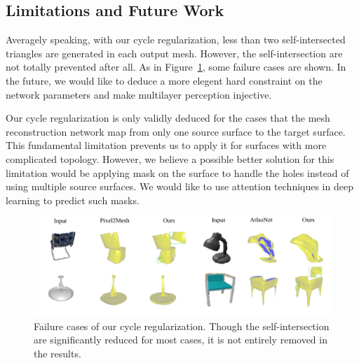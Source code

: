 \subsection{Limitations and Future Work}
Averagely speaking, with our cycle regularization, less than two self-intersected triangles are generated in each output mesh. However, the self-intersection are not totally prevented after all. As in Figure~\ref{fig:limit}, some failure cases are shown. In the future,  we would like to deduce a more elegent hard constraint on the network parameters and make multilayer perception injective. 

Our cycle regularization is only validly deduced for the cases that the mesh reconstruction network map from only one source surface to the target surface. This fundamental limitation prevents us to apply it for surfaces with more complicated topology. However, we believe a possible better solution for this limitation would be applying mask on the surface to handle the holes instead of using multiple source surfaces. We would like to use attention techniques in deep learning to predict such masks.
\begin{figure}
	\centering
	\includegraphics[width=\textwidth]{img/limit/limit}
	\caption{Failure cases of our cycle regularization. Though the self-intersection are significantly reduced for most cases, it is not entirely removed in the results.}
	\label{fig:limit}
\end{figure}